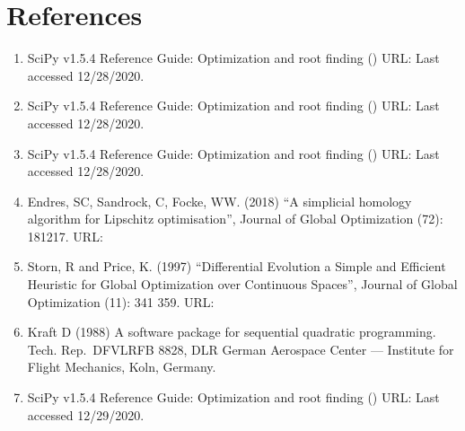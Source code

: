 \documentclass[letterpaper,10pt,english]{sphinxmanual}
\begin{document}
\section{References}
\label{\detokenize{optimizers:references}}\begin{enumerate}
%
\item {} 
\sphinxAtStartPar
{} SciPy v1.5.4 Reference Guide: Optimization
and root finding () URL:
Last accessed 12/28/2020.

\item {} 
\sphinxAtStartPar
{} SciPy v1.5.4 Reference
Guide: Optimization and root finding () URL:
Last accessed 12/28/2020.

\item {} 
\sphinxAtStartPar
{} SciPy v1.5.4 Reference Guide:
Optimization and root finding () URL:
Last accessed 12/28/2020.

\item {} 
\sphinxAtStartPar
Endres, SC, Sandrock, C, Focke, WW. (2018) “A simplicial homology
algorithm for Lipschitz optimisation”, Journal of Global Optimization
(72): 181\sphinxhyphen{}217. URL:

\item {} 
\sphinxAtStartPar
Storn, R and Price, K. (1997) “Differential Evolution \sphinxhyphen{} a Simple and
Efficient Heuristic for Global Optimization over Continuous Spaces”,
Journal of Global Optimization (11): 341 \sphinxhyphen{} 359. URL:

\item {} 
\sphinxAtStartPar
Kraft D (1988) A software package for sequential quadratic
programming. Tech. Rep. DFVLR\sphinxhyphen{}FB 88\sphinxhyphen{}28, DLR German Aerospace Center —
Institute for Flight Mechanics, Koln, Germany.

\item {} 
\sphinxAtStartPar
{} SciPy v1.5.4 Reference Guide:
Optimization and root finding () URL:
Last accessed 12/29/2020.

\end{enumerate}
\end{document}
